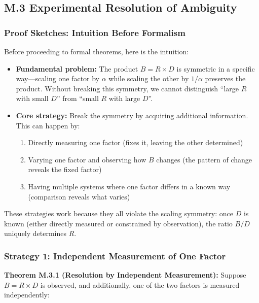 \documentclass[
]{article}
\providecommand{\tightlist}{%
  \setlength{\itemsep}{0pt}\setlength{\parskip}{0pt}}
\begin{document}
\subsection{M.3 Experimental Resolution of
Ambiguity}\label{m.3-experimental-resolution-of-ambiguity}

\subsubsection{Proof Sketches: Intuition Before
Formalism}\label{proof-sketches-intuition-before-formalism}

Before proceeding to formal theorems, here is the intuition:

\begin{itemize}
\item
  \textbf{Fundamental problem:} The product \(B = R \times D\) is
  symmetric in a specific way---scaling one factor by \(\alpha\) while
  scaling the other by \(1/\alpha\) preserves the product. Without
  breaking this symmetry, we cannot distinguish ``large \(R\) with small
  \(D\)'' from ``small \(R\) with large \(D\)''.
\item
  \textbf{Core strategy:} Break the symmetry by acquiring additional
  information. This can happen by:

  \begin{enumerate}
  \def\labelenumi{\arabic{enumi}.}
  \tightlist
  \item
    Directly measuring one factor (fixes it, leaving the other
    determined)
  \item
    Varying one factor and observing how \(B\) changes (the pattern of
    change reveals the fixed factor)
  \item
    Having multiple systems where one factor differs in a known way
    (comparison reveals what varies)
  \end{enumerate}
\end{itemize}

These strategies work because they all violate the scaling symmetry:
once \(D\) is known (either directly measured or constrained by
observation), the ratio \(B/D\) uniquely determines \(R\).

\subsubsection{Strategy 1: Independent Measurement of One
Factor}\label{strategy-1-independent-measurement-of-one-factor}

\textbf{Theorem M.3.1 (Resolution by Independent Measurement):} Suppose
\(B = R \times D\) is observed, and additionally, one of the two factors
is measured independently:
\end{document}
